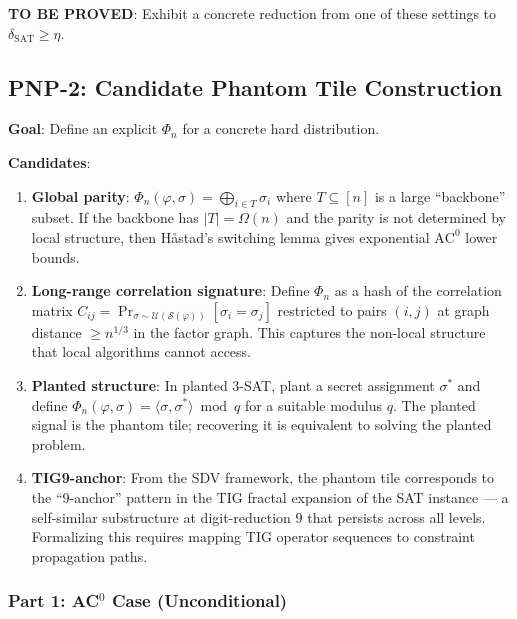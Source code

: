 \documentclass[11pt]{article}
\theoremstyle{definition}
\begin{document}
\textbf{TO BE PROVED}: Exhibit a concrete reduction from one of these settings to $\delta_{\mathrm{SAT}} \geq \eta$.

\subsection{PNP-2: Candidate Phantom Tile Construction}

\textbf{Goal}: Define an explicit $\Phi_n$ for a concrete hard distribution.

\textbf{Candidates}:
\begin{enumerate}
  \item \textbf{Global parity}: $\Phi_n(\varphi, \sigma) = \bigoplus_{i \in T} \sigma_i$
    where $T \subseteq [n]$ is a large ``backbone'' subset.
    If the backbone has $|T| = \Omega(n)$ and the parity is not determined by local structure,
    then H\aa stad's switching lemma gives exponential $\mathrm{AC}^0$ lower bounds.

  \item \textbf{Long-range correlation signature}: Define $\Phi_n$ as a hash of the
    correlation matrix $C_{ij} = \Pr_{\sigma \sim \mathcal{U}(\mathcal{S}(\varphi))}[\sigma_i = \sigma_j]$
    restricted to pairs $(i,j)$ at graph distance $\geq n^{1/3}$ in the factor graph.
    This captures the non-local structure that local algorithms cannot access.

  \item \textbf{Planted structure}: In planted 3-SAT, plant a secret assignment $\sigma^*$
    and define $\Phi_n(\varphi, \sigma) = \langle \sigma, \sigma^* \rangle \bmod q$ for
    a suitable modulus $q$.  The planted signal is the phantom tile;
    recovering it is equivalent to solving the planted problem.

  \item \textbf{TIG9-anchor}: From the SDV framework, the phantom tile corresponds to
    the ``9-anchor'' pattern in the TIG fractal expansion of the SAT instance ---
    a self-similar substructure at digit-reduction 9 that persists across all levels.
    Formalizing this requires mapping TIG operator sequences to constraint propagation paths.
\end{enumerate}


\subsubsection*{Part 1: AC$^0$ Case (Unconditional)}
\end{document}
